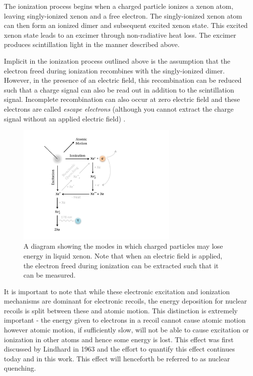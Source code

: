 The ionization process begins when a charged particle ionizes a xenon atom, leaving singly-ionized xenon and a free electron.  The singly-ionized xenon atom can then form an ionized dimer and subsequent excited xenon state.  This excited xenon state leads to an excimer through non-radiative heat loss.  The excimer produces scintillation light in the manner described above.

Implicit in the ionization process outlined above is the assumption that the electron freed during ionization recombines with the singly-ionized dimer.  However, in the presence of an electric field, this recombination can be reduced such that a charge signal can also be read out in addition to the scintillation signal.  Incomplete recombination can also occur at zero electric field and these electrons are called \textit{escape electrons} (although you cannot extract the charge signal without an applied electric field) \cite{doke2002absolute}.


\begin{figure}[t]
	\centering
	\includegraphics[width=0.7\textwidth]{observables_diagram}
	\caption{A diagram showing the modes in which charged particles may lose energy in liquid xenon.  Note that when an electric field is applied, the electron freed during ionization can be extracted such that it can be measured.}
	\label{fig:diagram_energy_deposition}
\end{figure}

It is important to note that while these electronic excitation and ionization mechanisms are dominant for electronic recoils, the energy deposition for nuclear recoils is split between these and atomic motion.  This distinction is extremely important - the energy given to electrons in a recoil cannot cause atomic motion however atomic motion, if sufficiently slow, will not be able to cause excitation or ionization in other atoms and hence some energy is lost.  This effect was first discussed by Lindhard in 1963 \cite{lindhard1963integral} and the effort to quantify this effect continues today and in this work.  This effect will henceforth be referred to as nuclear quenching.

